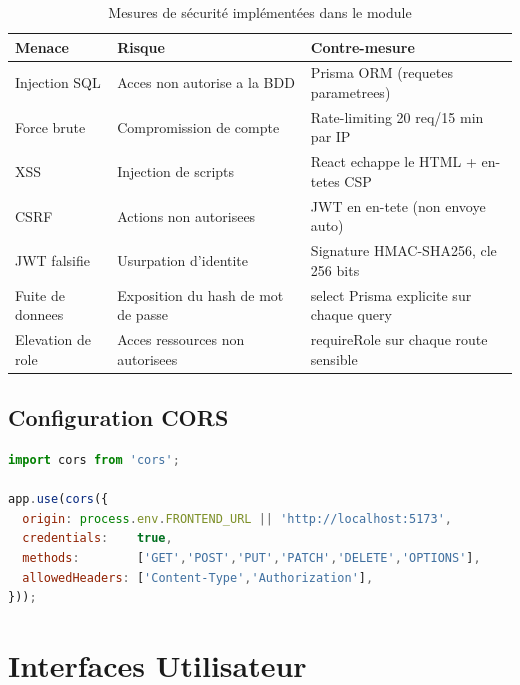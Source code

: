 \documentclass[12pt,a4paper,oneside]{report}
\begin{document}
\begin{table}[H]
\centering
\caption{Mesures de sécurité implémentées dans le module}
\begin{tabularx}{\linewidth}{@{}lLL@{}}
\toprule
\textbf{Menace}        & \textbf{Risque}                    & \textbf{Contre-mesure}               \\
\midrule
Injection SQL          & Acces non autorise a la BDD        & Prisma ORM (requetes parametrees)    \\
Force brute            & Compromission de compte            & Rate-limiting 20 req/15 min par IP   \\
XSS                    & Injection de scripts               & React echappe le HTML + en-tetes CSP \\
CSRF                   & Actions non autorisees             & JWT en en-tete (non envoye auto)     \\
JWT falsifie           & Usurpation d'identite              & Signature HMAC-SHA256, cle 256 bits  \\
Fuite de donnees       & Exposition du hash de mot de passe & select Prisma explicite sur chaque query \\
Elevation de role      & Acces ressources non autorisees    & requireRole sur chaque route sensible \\
\bottomrule
\end{tabularx}
\end{table}

\subsection{Configuration CORS}

\begin{lstlisting}[language=JavaScript,
  caption=app.ts --- Configuration CORS securisee]
import cors from 'cors';

app.use(cors({
  origin: process.env.FRONTEND_URL || 'http://localhost:5173',
  credentials:    true,
  methods:        ['GET','POST','PUT','PATCH','DELETE','OPTIONS'],
  allowedHeaders: ['Content-Type','Authorization'],
}));
\end{lstlisting}

\section{Interfaces Utilisateur}
\end{document}
